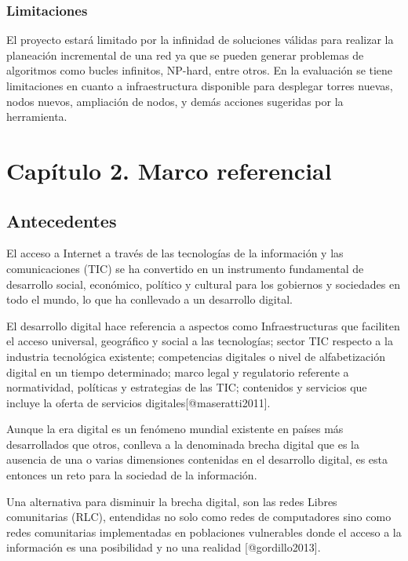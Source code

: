 \documentclass[]{article}
\begin{document}
\subsubsection{Limitaciones}\label{limitaciones}

El proyecto estará limitado por la infinidad de soluciones válidas para
realizar la planeación incremental de una red ya que se pueden generar
problemas de algoritmos como bucles infinitos, NP-hard, entre otros. En
la evaluación se tiene limitaciones en cuanto a infraestructura
disponible para desplegar torres nuevas, nodos nuevos, ampliación de
nodos, y demás acciones sugeridas por la herramienta.

\section{Capítulo 2. Marco
referencial}\label{capuxedtulo-2.-marco-referencial}

\subsection{Antecedentes}\label{antecedentes}

El acceso a Internet a través de las tecnologías de la información y las
comunicaciones (TIC) se ha convertido en un instrumento fundamental de
desarrollo social, económico, político y cultural para los gobiernos y
sociedades en todo el mundo, lo que ha conllevado a un desarrollo
digital.

El desarrollo digital hace referencia a aspectos como Infraestructuras
que faciliten el acceso universal, geográfico y social a las
tecnologías; sector TIC respecto a la industria tecnológica existente;
competencias digitales o nivel de alfabetización digital en un tiempo
determinado; marco legal y regulatorio referente a normatividad,
políticas y estrategias de las TIC; contenidos y servicios que incluye
la oferta de servicios digitales{[}@maseratti2011{]}.

Aunque la era digital es un fenómeno mundial existente en países más
desarrollados que otros, conlleva a la denominada brecha digital que es
la ausencia de una o varias dimensiones contenidas en el desarrollo
digital, es esta entonces un reto para la sociedad de la información.

Una alternativa para disminuir la brecha digital, son las redes Libres
comunitarias (RLC), entendidas no solo como redes de computadores sino
como redes comunitarias implementadas en poblaciones vulnerables donde
el acceso a la información es una posibilidad y no una realidad
{[}@gordillo2013{]}.
\end{document}

